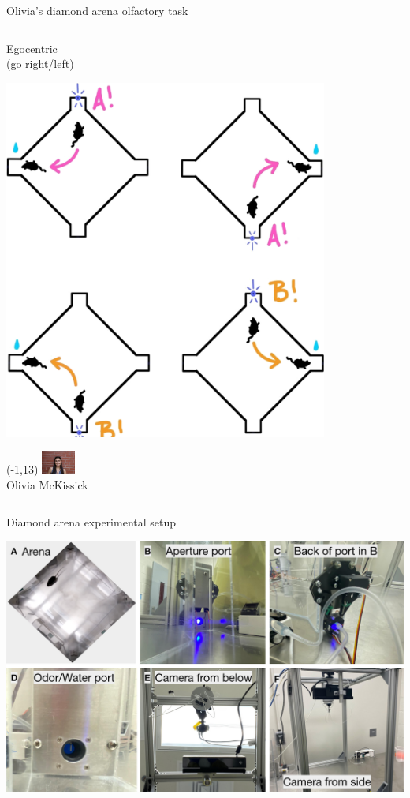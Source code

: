 \documentclass[bigger]{beamer}
\begin{document}
\begin{frame}[label={sec:org5124494}]{Olivia's diamond arena olfactory task}
\begin{columns}
\begin{column}[t]{0.5\columnwidth}
\center
Egocentric\\
(go right/left)
\begin{center}
\includegraphics[width=0.8\textwidth]{img/egocentric-task.png}
\end{center}

\begin{textblock}{5}(-1,13)
\center
\includegraphics[width=3em]{img/olivia.jpg}\\
\scriptsize
Olivia McKissick
\end{textblock}
\end{column}
\end{columns}
\end{frame}


\begin{frame}[label={sec:orgae6427e}]{Diamond arena experimental setup}
\begin{center}
\includegraphics[width=.9\linewidth]{img/physical-diamond-arena.png}
\end{center}
\end{frame}
\end{document}
